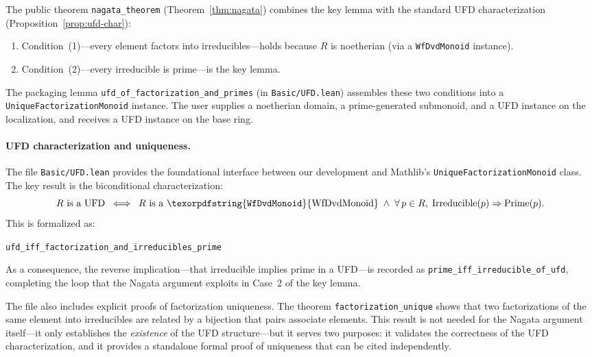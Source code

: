 \documentclass[11pt]{article}
\theoremstyle{plain}
\theoremstyle{definition}
\theoremstyle{remark}
\newcommand{\li}[1]{\texorpdfstring{\texttt{#1}}{#1}}
\newcommand{\lf}[1]{\texorpdfstring{\nolinkurl{#1}}{#1}}
\begin{document}
The public theorem \li{nagata\_theorem} (Theorem~\ref{thm:nagata}) combines the
key lemma with the standard UFD characterization
(Proposition~\ref{prop:ufd-char}):
\begin{enumerate}[nosep]
\item Condition~(1)---every element factors into irreducibles---holds because
  $R$ is noetherian (via a \li{WfDvdMonoid} instance).
\item Condition~(2)---every irreducible is prime---is the key lemma.
\end{enumerate}
The packaging lemma \li{ufd\_of\_factorization\_and\_primes} (in
\lf{Basic/UFD.lean}) assembles these two conditions into a
\li{UniqueFactorizationMonoid} instance.  The user supplies a noetherian
domain, a prime-generated submonoid, and a UFD instance on the localization,
and receives a UFD instance on the base ring.

\paragraph{UFD characterization and uniqueness.}
The file \lf{Basic/UFD.lean} provides the foundational interface between our
development and Mathlib's \li{UniqueFactorizationMonoid} class.  The key result
is the biconditional characterization:
\[
  R \text{ is a UFD}
  \;\;\Longleftrightarrow\;\;
  R \text{ is a \textnormal{\li{WfDvdMonoid}}}
  \;\wedge\;
  \forall\, p\in R,\;\mathrm{Irreducible}(p)\Rightarrow\mathrm{Prime}(p).
\]
This is formalized as:
\begin{center}
\li{ufd\_iff\_factorization\_and\_irreducibles\_prime}
\end{center}
As a consequence, the reverse implication---that irreducible implies prime in
a UFD---is recorded as \li{prime\_iff\_irreducible\_of\_ufd}, completing the
loop that the Nagata argument exploits in Case~2 of the key lemma.

The file also includes explicit proofs of factorization uniqueness.
The theorem \li{factorization\_\allowbreak{}unique} shows that two factorizations
of the same element into irreducibles are related by a bijection
that pairs associate elements.  This result is not needed for
the Nagata argument itself---it only establishes the \emph{existence}
of the UFD structure---but it serves two purposes: it validates
the correctness of the UFD characterization, and it provides a
standalone formal proof of uniqueness that can be cited independently.


\end{document}
